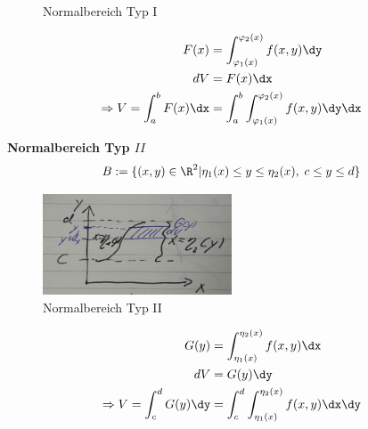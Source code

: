 \begin{definition}
\begin{figure}[H]
		  \caption{Normalbereich Typ I}
		  \label{fig:nb_typ1}
	  \end{figure}
	  \vspace{-0.5cm}
	  \begin{align}
	  	F(x) &= \int_{\varphi_1(x)}^{\varphi_2(x)} f(x,y) \dy \nonumber \\
	  	dV &= F(x) \dx \nonumber \\
	  	\Rightarrow V = \int_a^b F(x) \dx &= \int_a^b \int_{\varphi_1(x)}^{\varphi_2(x)}f(x,y) \dy \dx
	  \end{align}
	  
 	 \textbf{Normalbereich Typ $II$}
 	 \begin{equation}
 	 	B:= \lbrace (x,y) \in \R^2| \eta_1(x) \leq y \leq \eta_2(x), \; c \leq y \leq d\rbrace
 	 \end{equation}
	  \begin{figure}[H] 
		  \centering
		  \includegraphics[width=0.5\textwidth]{./img/nb_typ2.jpg}
		  \caption{Normalbereich Typ II}
		  \label{fig:nb_typ2}
	  \end{figure}
	  \vspace{-0.5cm}
	  \begin{align}
	  	G(y) &= \int_{\eta_1(x)}^{\eta_2(x)} f(x,y) \dx \nonumber \\
	  	dV &= G(y) \dy \nonumber \\
	  	\Rightarrow V = \int_c^d G(y) \dy &= \int_c^d \int_{\eta_1(x)}^{\eta_2(x)}f(x,y) \dx \dy
	  \end{align}
 	 
 	  
	  \end{definition}
	  
	  